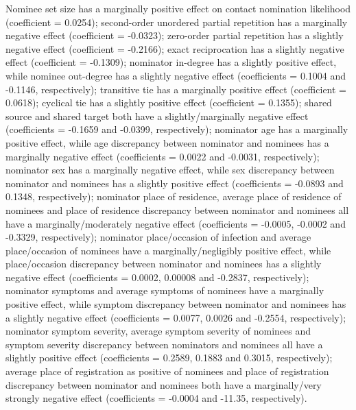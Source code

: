 Nominee set size has a marginally positive effect on contact nomination likelihood (coefficient = 0.0254); second-order unordered partial repetition has a marginally negative effect (coefficient = -0.0323); zero-order partial repetition has a slightly negative effect (coefficient = -0.2166); exact reciprocation has a slightly negative effect (coefficient = -0.1309); nominator in-degree has a slightly positive effect, while nominee out-degree has a slightly negative effect (coefficients = 0.1004 and -0.1146, respectively); transitive tie has a marginally positive effect (coefficient = 0.0618); cyclical tie has a slightly positive effect (coefficient = 0.1355); shared source and shared target both have a slightly/marginally negative effect (coefficients = -0.1659 and -0.0399, respectively); nominator age has a marginally positive effect, while age discrepancy between nominator and nominees has a marginally negative effect (coefficients = 0.0022 and -0.0031, respectively); nominator sex has a marginally negative effect, while sex discrepancy between nominator and nominees has a slightly positive effect (coefficients = -0.0893 and 0.1348, respectively); nominator place of residence, average place of residence of nominees and place of residence discrepancy between nominator and nominees all have a marginally/moderately negative effect (coefficients = -0.0005, -0.0002 and -0.3329, respectively); nominator place/occasion of infection and average place/occasion of nominees have a marginally/negligibly positive effect, while place/occasion discrepancy between nominator and nominees has a slightly negative effect (coefficients = 0.0002, 0.00008 and -0.2837, respectively); nominator symptoms and average symptoms of nominees have a marginally positive effect, while symptom discrepancy between nominator and nominees has a slightly negative effect (coefficients = 0.0077, 0.0026 and -0.2554, respectively); nominator symptom severity, average symptom severity of nominees and symptom severity discrepancy between nominators and nominees all have a slightly positive effect (coefficients = 0.2589, 0.1883 and 0.3015, respectively); average place of registration as positive of nominees and place of registration discrepancy between nominator and nominees both have a marginally/very strongly negative effect (coefficients = -0.0004 and -11.35, respectively).

